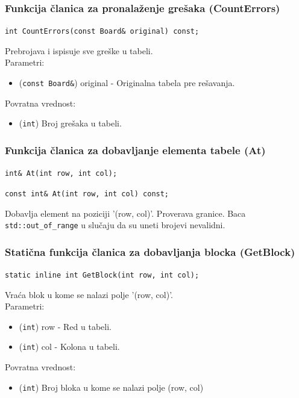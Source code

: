 \documentclass[a4paper]{article}
\begin{document}
    \subsubsection{Funkcija članica za pronalaženje grešaka (CountErrors)}
    \texttt{int CountErrors(const Board\& original) const;}
    \par Prebrojava i ispisuje sve greške u tabeli.\\
    Parametri:
    \begin{itemize}
        \item (\texttt{const Board\&}) original - Originalna tabela pre rešavanja.
    \end{itemize}
    Povratna vrednost:
    \begin{itemize}
        \item (\texttt{int}) Broj grešaka u tabeli.
    \end{itemize}

    \subsubsection{Funkcija članica za dobavljanje elementa tabele (At)}
    \texttt{int\& At(int row, int col);}
    \par\texttt{const int\& At(int row, int col) const;}
    \par Dobavlja element na poziciji '(row, col)'. Proverava granice. Baca \\ \texttt{std::out\_of\_range} u slučaju da
    su uneti brojevi nevalidni.
    
    \subsubsection{Statična funkcija članica za dobavljanja blocka (GetBlock)}
    \texttt{static inline int GetBlock(int row, int col);}
    \par Vraća blok u kome se nalazi polje '(row, col)'.\\
    Parametri:
    \begin{itemize}
        \item (\texttt{int}) row - Red u tabeli.
        \item (\texttt{int}) col - Kolona u tabeli.
    \end{itemize}
    Povratna vrednost:
    \begin{itemize}
        \item (\texttt{int}) Broj bloka u kome se nalazi polje (row, col)
    \end{itemize}
\end{document}
